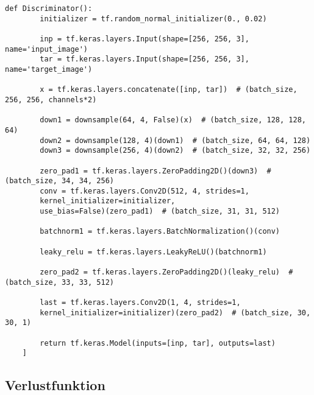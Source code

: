 \begin{lstlisting}[language=pyhaff, caption={Diskriminator}, label={cod:Pix2PixGAN Diskriminator}]
	def Discriminator():
		initializer = tf.random_normal_initializer(0., 0.02)
	
		inp = tf.keras.layers.Input(shape=[256, 256, 3], name='input_image')
		tar = tf.keras.layers.Input(shape=[256, 256, 3], name='target_image')
	
		x = tf.keras.layers.concatenate([inp, tar])  # (batch_size, 256, 256, channels*2)
	
		down1 = downsample(64, 4, False)(x)  # (batch_size, 128, 128, 64)
		down2 = downsample(128, 4)(down1)  # (batch_size, 64, 64, 128)
		down3 = downsample(256, 4)(down2)  # (batch_size, 32, 32, 256)
	
		zero_pad1 = tf.keras.layers.ZeroPadding2D()(down3)  # (batch_size, 34, 34, 256)
		conv = tf.keras.layers.Conv2D(512, 4, strides=1,
		kernel_initializer=initializer,
		use_bias=False)(zero_pad1)  # (batch_size, 31, 31, 512)
	
		batchnorm1 = tf.keras.layers.BatchNormalization()(conv)
	
		leaky_relu = tf.keras.layers.LeakyReLU()(batchnorm1)
	
		zero_pad2 = tf.keras.layers.ZeroPadding2D()(leaky_relu)  # (batch_size, 33, 33, 512)
	
		last = tf.keras.layers.Conv2D(1, 4, strides=1,
		kernel_initializer=initializer)(zero_pad2)  # (batch_size, 30, 30, 1)
	
		return tf.keras.Model(inputs=[inp, tar], outputs=last)
	]
\end{lstlisting}

\subsection{Verlustfunktion}
